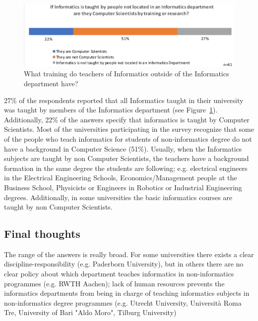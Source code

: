 \begin{figure}[h]
\includegraphics[width = \linewidth]{charts/2d.jpg}
\caption{What training do teachers of Informatics outside of the Informatics department have?}
\label{sect3:whoteaches}
\end{figure}
27\% of the respondents reported that all Informatics taught in their university was taught by members of the Informatics department (see Figure~\ref{sect3:whoteaches}).
Additionally, 22\% of the answers specify that informatics is taught by Computer Scientists. 
Most of the universities participating in the survey recognize that some of the people who teach informatics for students of non-informatics degree do not have a background in Computer Science (51\%). Usually, when the Informatics subjects are  taught by non Computer Scientists, the teachers have a background formation in the same degree the students are following; e.g. electrical engineers in the Electrical Engineering Schools, Economics/Management people at the Business School, Physicists or Engineers in Robotics or Industrial Engineering degrees. Additionally, in some universities the basic informatics courses  are taught by non Computer Scientists.   


\subsection{Final thoughts}

The range of the answers is really broad. For some universities there exists a clear discipline-responsibility (e.g. Paderborn University), but in others there are no clear policy about which department teaches informatics in non-informatics programmes (e.g. RWTH Aachen); lack of human resources prevents the informatics departments from being in charge of teaching informatics subjects in non-informatics degree programmes (e.g. Utrecht University, Università Roma Tre, University of Bari "Aldo Moro",  Tilburg University)
